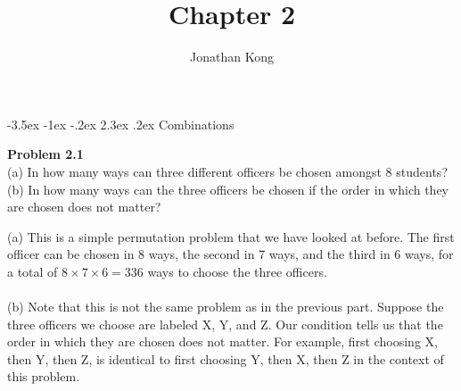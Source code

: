\documentclass[11pt]{scrartcl}
\title{\normalfont\notesize\textbf{Chapter 2}}
\author{Jonathan Kong}
\date{}
\makeatletter
\renewcommand\section{\@startsection{section}{1}{\z@}%
                                   {-3.5ex \@plus -1ex \@minus -.2ex}%
                                   {2.3ex \@plus.2ex}%
                                   {\normalfont\large\bfseries}}
\makeatother
\begin{document}
\maketitle
\section{Combinations}
\begin{tcolorbox}
\textbf{Problem 2.1}\\
(a) In how many ways can three different officers be chosen amongst 8 students?\\
(b) In how many ways can the three officers be chosen if the order in which they are chosen does not matter?
\end{tcolorbox}
\noindent 
(a) This is a simple permutation problem that we have looked at before. The first officer can be chosen in 8 ways, the second in 7 ways, and the third in 6 ways, for a total of $8 \times 7 \times 6=336$ ways to choose the three officers. \\
\\
\noindent
(b) Note that this is not the same problem as in the previous part. Suppose the three officers we choose are labeled X, Y, and Z. Our condition tells us that the order in which they are chosen does not matter. For example, first choosing X, then Y, then Z, is identical to first choosing Y, then X, then Z in the context of this problem. 
\end{document}
